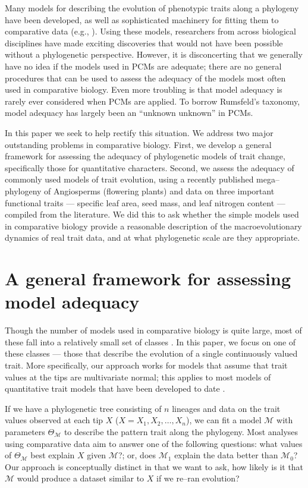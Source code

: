 \documentclass[a4paper,12pt]{article}
\begin{document}
Many models for describing the evolution of phenotypic traits along a phylogeny have been developed, as well as sophisticated machinery for fitting them to comparative data (e.g., \citep{Felsenstein1985, Hansen1997, Pagel1999, Blomberg2003, ButlerKing2004, Omeara2006, Eastman2011, Beaulieu2012, SlaterMEE, UyedaBayou}). Using these models, researchers from across biological disciplines have made exciting discoveries that would not have been possible without a phylogenetic perspective. However, it is disconcerting that we generally have no idea if the models used in PCMs are adequate; there are no general procedures that can be used to assess the adequacy of the models most often used in comparative biology. Even more troubling is that model adequacy is rarely ever considered when PCMs are applied. To borrow Rumsfeld's taxonomy, model adequacy has largely been an ``unknown unknown'' in PCMs.

In this paper we seek to help rectify this situation. We address two major outstanding problems in comparative biology. First, we develop a general framework for assessing the adequacy of phylogenetic models of trait change, specifically those for quantitative characters. Second, we assess the adequacy of commonly used models of trait evolution, using a recently published mega--phylogeny of Angiosperms (flowering plants) \citep{Zanne2013} and data on three important functional traits --- specific leaf area, seed mass, and leaf nitrogen content --- compiled from the literature. We did this to ask whether the simple models used in comparative biology provide a reasonable description of the macroevolutionary dynamics of real trait data, and at what phylogenetic scale are they appropriate.

\section{A general framework for assessing model adequacy}
Though the number of models used in comparative biology is quite large, most of these fall into a relatively small set of classes \citep{Omeara2012}. In this paper, we focus on one of these classes --- those that describe the evolution of a single continuously valued trait. More specifically, our approach works for models that assume that trait values at the tips are multivariate normal; this applies to most models of quantitative trait models that have been developed to date \citep{Omeara2012}.

If we have a phylogenetic tree consisting of $n$ lineages and data on the trait values observed at each tip $X$ ($X=X_1, X_2, \ldots, X_n$), we can fit a model $\mathcal{M}$ with parameters $\Theta_{\mathcal{M}}$ to describe the pattern trait along the phylogeny. Most analyses using comparative data aim to answer one of the following questions: what values of $\Theta_{\mathcal{M}}$ best explain $X$ given $\mathcal{M}$?; or, does $\mathcal{M}_1$ explain the data better than $\mathcal{M}_0$? Our approach is conceptually distinct in that we want to ask, how likely is it that $\mathcal{M}$ would produce a dataset similar to $X$ if we re--ran evolution?
\end{document}
